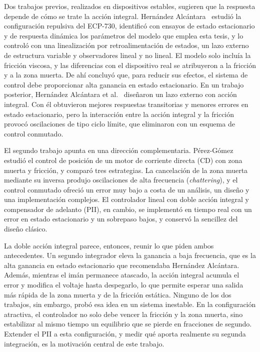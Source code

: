 Dos trabajos previos, realizados en dispositivos estables, sugieren que la respuesta depende de cómo se trate la acción integral. Hernández Alcántara~\cite{diana_tesis} estudió la configuración repulsiva del ECP-730, identificó con ensayos de estado estacionario y de respuesta dinámica los parámetros del modelo que emplea esta tesis, y lo controló con una linealización por retroalimentación de estados, un lazo externo de estructura variable y observadores lineal y no lineal. El modelo solo incluía la fricción viscosa, y las diferencias con el dispositivo real se atribuyeron a la fricción y a la zona muerta. De ahí concluyó que, para reducir sus efectos, el sistema de control debe proporcionar alta ganancia en estado estacionario. En un trabajo posterior, Hernández Alcántara et al.~\cite{alcantara} diseñaron un lazo externo con acción integral. Con él obtuvieron mejores respuestas transitorias y menores errores en estado estacionario, pero la interacción entre la acción integral y la fricción provocó oscilaciones de tipo ciclo límite, que eliminaron con un esquema de control conmutado.

El segundo trabajo apunta en una dirección complementaria. Pérez-Gómez~\cite{perez} estudió el control de posición de un motor de corriente directa (CD) con zona muerta y fricción, y comparó tres estrategias. La cancelación de la zona muerta mediante su inversa produjo oscilaciones de alta frecuencia (\emph{chattering}), y el control conmutado ofreció un error muy bajo a costa de un análisis, un diseño y una implementación complejos. El controlador lineal con doble acción integral y compensador de adelanto (PII), en cambio, se implementó en tiempo real con un error en estado estacionario y un sobrepaso bajos, y conservó la sencillez del diseño clásico.

La doble acción integral parece, entonces, reunir lo que piden ambos antecedentes. Un segundo integrador eleva la ganancia a baja frecuencia, que es la alta ganancia en estado estacionario que recomendaba Hernández Alcántara. Además, mientras el imán permanece atascado, la acción integral acumula el error y modifica el voltaje hasta despegarlo, lo que permite esperar una salida más rápida de la zona muerta y de la fricción estática. Ninguno de los dos trabajos, sin embargo, probó esa idea en un sistema inestable. En la configuración atractiva, el controlador no solo debe vencer la fricción y la zona muerta, sino estabilizar al mismo tiempo un equilibrio que se pierde en fracciones de segundo. Extender el PII a esta configuración, y medir qué aporta realmente su segunda integración, es la motivación central de este trabajo.

